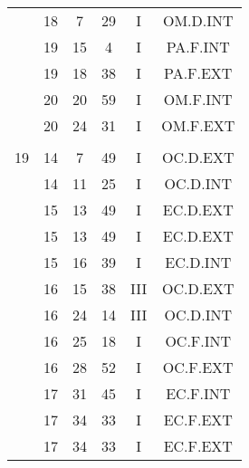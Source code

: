 \documentclass[12pt, a4paper]{article}
\begin{document}
\begin{multicols}{3}
{\begin{tabular}{c c c c c c}
	 	 	 	 & 18 & 7 & 29 & I & OM.D.INT\\%
	 	 	 	 & 19 & 15 & 4 & I & PA.F.INT\\%
	 	 	 	 & 19 & 18 & 38 & I & PA.F.EXT\\%
	 	 	 	 & 20 & 20 & 59 & I & OM.F.INT\\%
	 	 	 	 & 20 & 24 & 31 & I & OM.F.EXT\\%
	 	 	 	 & & & & & \\%
	 	 	 	19 & 14 & 7 & 49 & I & OC.D.EXT\\%
	 	 	 	 & 14 & 11 & 25 & I & OC.D.INT\\%
	 	 	 	 & 15 & 13 & 49 & I & EC.D.EXT\\%
	 	 	 	 & 15 & 13 & 49 & I & EC.D.EXT\\%
	 	 	 	 & 15 & 16 & 39 & I & EC.D.INT\\%
	 	 	 	 & 16 & 15 & 38 & III & OC.D.EXT\\%
	 	 	 	 & 16 & 24 & 14 & III & OC.D.INT\\%
	 	 	 	 & 16 & 25 & 18 & I & OC.F.INT\\%
	 	 	 	 & 16 & 28 & 52 & I & OC.F.EXT\\%
	 	 	 	 & 17 & 31 & 45 & I & EC.F.INT\\%
	 	 	 	 & 17 & 34 & 33 & I & EC.F.EXT\\%
	 	 	 	 & 17 & 34 & 33 & I & EC.F.EXT\\%
	 	 \end{tabular}
 	}
\end{multicols}
\end{document}
